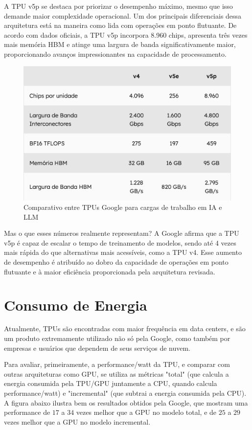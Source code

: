 \documentclass{report}
\begin{document}
A TPU v5p se destaca por priorizar o desempenho máximo, mesmo que isso demande maior complexidade operacional. Um dos principais diferenciais dessa arquitetura está na maneira como lida com operações em ponto flutuante. De acordo com dados oficiais, a TPU v5p incorpora 8.960 chips, apresenta três vezes mais memória HBM e atinge uma largura de banda significativamente maior, proporcionando avanços impressionantes na capacidade de processamento.

\begin{figure}[h]
\includegraphics[scale=0.7]{comparativo-tpus}
\centering
\caption{Comparativo entre TPUs Google para cargas de trabalho em IA e LLM}
\end{figure}

Mas o que esses números realmente representam? A Google afirma que a TPU v5p é capaz de escalar o tempo de treinamento de modelos, sendo até 4 vezes mais rápida do que alternativas mais acessíveis, como a TPU v4. Esse aumento de desempenho é atribuído ao dobro da capacidade de operações em ponto flutuante e à maior eficiência proporcionada pela arquitetura revisada.

\chapter{Consumo de Energia}

\setlength{\parskip}{1em}\hspace{0.5cm} Atualmente, TPUs são encontradas com maior frequência em data centers, e são um produto extremamente utilizado não só pela Google, como também por empresas e usuários que dependem de seus serviços de nuvem.

Para avaliar, primeiramente, a performance/watt da TPU, e comparar com outras arquiteturas como GPU, se utiliza as métricas "total" (que calcula a energia consumida pela TPU/GPU juntamente a CPU, quando calcula performance/watt) e "incremental" (que subtrai a energia consumida pela CPU). A figura abaixo ilustra bem os resultados obtidos pela Google, que mostram uma performance de $17$ a $34$ vezes melhor que a GPU no modelo total, e de $25$ a $29$ vezes melhor que a GPU no modelo incremental.
\end{document}
